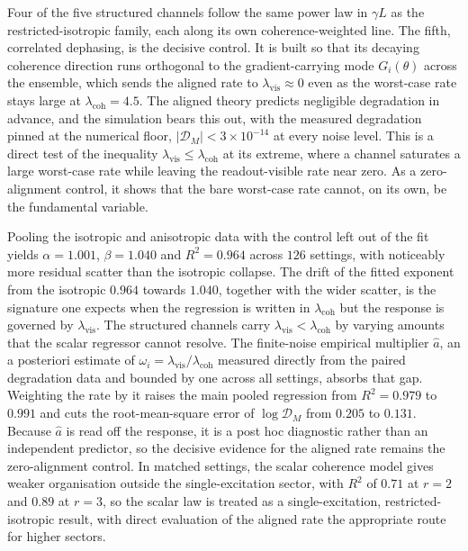 \documentclass{article}
\newcommand{\DM}{\mathcal{D}_M}
\newcommand{\lcoh}{\lambda_{\mathrm{coh}}}
\newcommand{\lvis}{\lambda_{\mathrm{vis}}}
\newcommand{\aeff}{\widehat{a}}
\begin{document}
Four of the five structured channels follow the same power law in $\gamma L$ as the restricted-isotropic family, each along its own coherence-weighted line. The fifth, correlated dephasing, is the decisive control. It is built so that its decaying coherence direction runs orthogonal to the gradient-carrying mode $G_i(\theta)$ across the ensemble, which sends the aligned rate to $\lvis\approx0$ even as the worst-case rate stays large at $\lcoh=4.5$. The aligned theory predicts negligible degradation in advance, and the simulation bears this out, with the measured degradation pinned at the numerical floor, $|\DM|<3\times10^{-14}$ at every noise level. This is a direct test of the inequality $\lvis\leq\lcoh$ at its extreme, where a channel saturates a large worst-case rate while leaving the readout-visible rate near zero. As a zero-alignment control, it shows that the bare worst-case rate cannot, on its own, be the fundamental variable.

Pooling the isotropic and anisotropic data with the control left out of the fit yields $\alpha=1.001$, $\beta=1.040$ and $R^2=0.964$ across $126$ settings, with noticeably more residual scatter than the isotropic collapse. The drift of the fitted exponent from the isotropic $0.964$ towards $1.040$, together with the wider scatter, is the signature one expects when the regression is written in $\lcoh$ but the response is governed by $\lvis$. The structured channels carry $\lvis<\lcoh$ by varying amounts that the scalar regressor cannot resolve. The finite-noise empirical multiplier $\aeff$, an a posteriori estimate of $\omega_i=\lvis/\lcoh$ measured directly from the paired degradation data and bounded by one across all settings, absorbs that gap. Weighting the rate by it raises the main pooled regression from $R^2=0.979$ to $0.991$ and cuts the root-mean-square error of $\log\DM$ from $0.205$ to $0.131$. Because $\aeff$ is read off the response, it is a post hoc diagnostic rather than an independent predictor, so the decisive evidence for the aligned rate remains the zero-alignment control. In matched settings, the scalar coherence model gives weaker organisation outside the single-excitation sector, with $R^2$ of $0.71$ at $r=2$ and $0.89$ at $r=3$, so the scalar law is treated as a single-excitation, restricted-isotropic result, with direct evaluation of the aligned rate the appropriate route for higher sectors.
\end{document}
